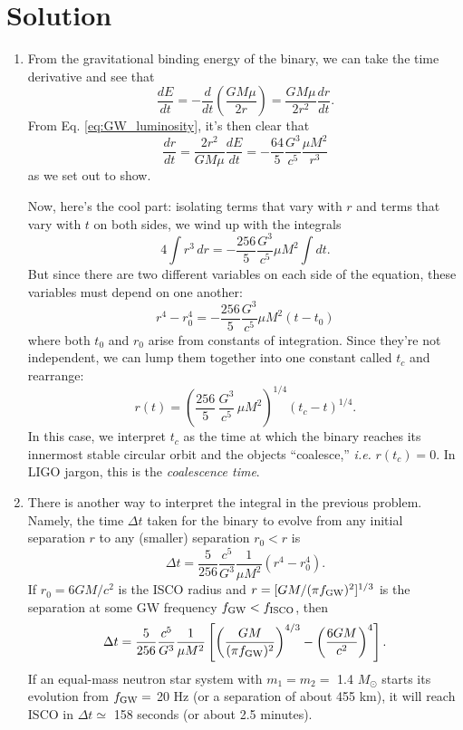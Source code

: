 \documentclass[11pt]{article}
\begin{document}
\section*{Solution}

\begin{enumerate}

\item From the gravitational binding energy of the binary, we can take the time derivative and see that
\[ \frac{dE}{dt} = -\frac{d}{dt}\left(\frac{GM\mu}{2r}\right) = \frac{GM\mu}{2r^2} \frac{dr}{dt}. \]
From Eq. \ref{eq:GW_luminosity}, it's then clear that
\[ \frac{dr}{dt} = \frac{2r^2}{GM\mu} \frac{dE}{dt} = - \frac{64}{5} \frac{G^3}{c^5} \frac{\mu M^2}{r^3} \]
as we set out to show.

\hspace{15pt} Now, here's the cool part: isolating terms that vary with $r$ and terms that vary with $t$ on both sides, we wind up with the integrals
\[ 4 \int r^3 \, dr = - \frac{256}{5} \frac{G^3}{c^5} \mu M^2 \int dt. \]
But since there are two different variables on each side of the equation, these variables must depend on one another:
\[ r^4 - r_0^4 = - \frac{256}{5} \frac{G^3}{c^5} \mu M^2 \left(t - t_0\right) \]
where both $t_0$ and $r_0$ arise from constants of integration. Since they're not independent, we can lump them together into one constant called $t_c$ and rearrange:
\begin{equation}\label{eq:roft}
r(t) = \left( \frac{256}{5}\,\frac{G^3}{c^5}\,\mu M^2 \right)^{1/4} \left(t_c - t\right)^{1/4}.
\end{equation}
In this case, we interpret $t_c$ as the time at which the binary reaches its innermost stable circular orbit and the objects ``coalesce,'' \textit{i.e.} $r(t_c) = 0$. In LIGO jargon, this is the \textit{coalescence time}.

\item There is another way to interpret the integral in the previous problem. Namely, the time $\Delta t$ taken for the binary to evolve from any initial separation $r$ to any (smaller) separation $r_0 < r$ is
\[ \Delta t = \frac{5}{256} \frac{c^5}{G^3} \frac{1}{\mu M^2} \left(r^4 - r_0^4\right). \]
If $r_0 = 6GM/c^2$ is the ISCO radius and $r = [GM/(\pi f_{\rm GW})^2]^{1/3}$ is the separation at some GW frequency $f_{\rm GW} < f_{\rm ISCO}$, then
\[ \Delta t = \frac{5}{256} \frac{c^5}{G^3} \frac{1}{\mu M^2} \left[\left(\frac{GM}{(\pi f_{\rm GW})^2}\right)^{4/3} - \left(\frac{6GM}{c^2}\right)^4\right]. \]
If an equal-mass neutron star system with $m_1=m_2=$ 1.4 $M_{\odot}$ starts its evolution from $f_{\rm GW}=$ 20 Hz (or a separation of about 455 km), it will reach ISCO in $\Delta t \simeq$ 158 seconds (or about 2.5 minutes).


\end{enumerate}
\end{document}
